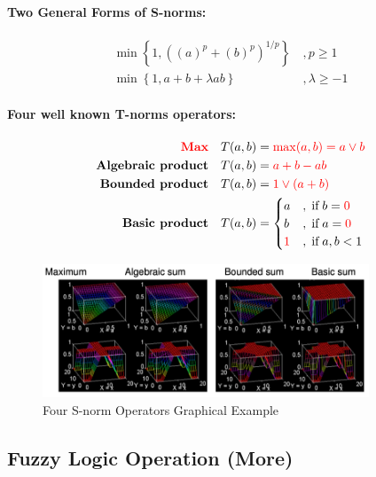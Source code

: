 \documentclass{tron}
\begin{document}
\paragraph{Two General Forms of S-norms:}
\begin{align}
	\min \left\{1, \left((a)^p + (b)^p \right)^{1/p}\right\}\, &, p \geq 1 \\
	\min \left\{1, a + b + \lambda ab\right\}\, &, \lambda \geq -1
\end{align}
\paragraph{Four well known T-norms operators:}
\begin{align}
	\textbf{\textcolor{red}{Max}} 			\quad & T(a,b) = \textcolor{red}{\max(a,b) = a \lor b} \\
	\textbf{Algebraic product} 	\quad & T(a,b) = \textcolor{red}{a + b - ab} \\
	\textbf{Bounded product} 	\quad & T(a,b) = \textcolor{red}{1 \lor (a + b)} \\
	\textbf{Basic product} 		\quad & T(a,b) = \begin{cases}
		a 	& ,\;\text{if}\; b = \textcolor{red}{0} \\
		b 	& ,\;\text{if}\; a = \textcolor{red}{0} \\
	\textcolor{red}{1} & ,\;\text{if}\; a, b < 1 \\
	\end{cases} 
\end{align}
\begin{figure}[H]
	\centering
	\includegraphics[height=150px]{Figs/Fuzzy/S-norm}
	\caption{Four S-norm Operators Graphical Example}
	\label{fig:fuzzy:S-norm:ex}
\end{figure}



\clearpage
\subsection{Fuzzy Logic Operation (More)}
\end{document}
